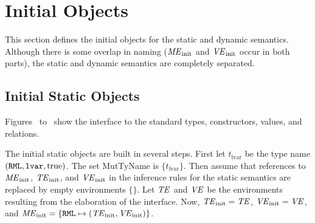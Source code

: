 %
\section{Initial Objects}
This section defines the initial objects for the static and dynamic semantics.
Although there is some overlap in naming
($\mbox{\textit{ME}}_{\mathrm{init}}$ and $\mbox{\textit{VE}}_{\mathrm{init}}$ occur in both parts),
the static and dynamic semantics are completely separated.
%
\subsection{Initial Static Objects}

Figures~ to~
show the interface to the standard types, constructors, values, and relations.

The initial static objects are built in several steps.
First let $t_{\mathrm{lvar}}$ be the type name $(\mbox{\texttt{RML}},\mbox{\texttt{lvar}},\mathrm{true})$.
The set MutTyName is $\{t_{\mathrm{lvar}}\}$.
Then assume that references to $\mbox{\textit{ME}}_{\mathrm{init}}$, $\mbox{\textit{TE}}_{\mathrm{init}}$,
and $\mbox{\textit{VE}}_{\mathrm{init}}$ in the inference rules for the static semantics are
replaced by empty environments $\{\}$.
Let $\mbox{\textit{TE}}$ and $\mbox{\textit{VE}}$ be the environments resulting from the
elaboration of the  interface.
Now, $\mbox{\textit{TE}}_{\mathrm{init}} = \mbox{\textit{TE}}$, $\mbox{\textit{VE}}_{\mathrm{init}} = \mbox{\textit{VE}}$, and
$\mbox{\textit{ME}}_{\mathrm{init}} = \{\mbox{\texttt{RML}}\mapsto(\mbox{\textit{TE}}_{\mathrm{init}},\mbox{\textit{VE}}_{\mathrm{init}})\}$.

